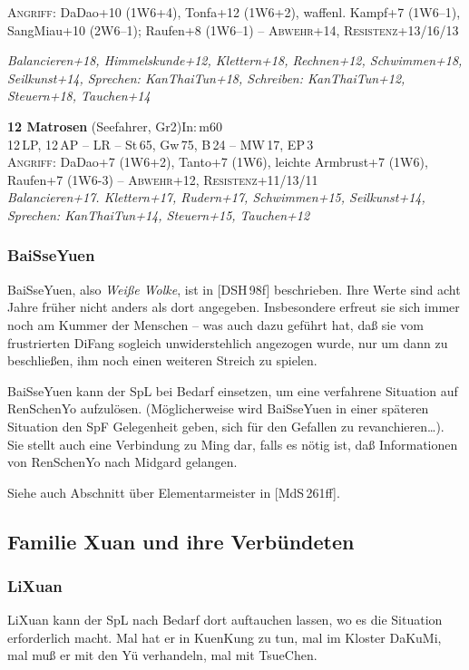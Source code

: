 \documentclass[
a4paper,
twoside,
DIV=calc,
BCOR=4mm,
fontsize=9pt,
twocolumn=on,
titlepage=on,
parskip=half
]{scrartcl}
\begin{document}
\textsc{Angriff:} DaDao+10 (1W6+4), Tonfa+12 (1W6+2),
waffenl. Kampf+7 (1W6--1), SangMiau+10 (2W6--1); Raufen+8 (1W6--1) -- 
\textsc{Abwehr}+14, \textsc{Resistenz}+13/16/13

\emph{Balancieren+18, Himmelskunde+12, Klettern+18, Rechnen+12,
  Schwimmen+18, Seilkunst+14, Sprechen: KanThaiTun+18, Schreiben:
  KanThaiTun+12, Steuern+18, Tauchen+14}

\textbf{12 Matrosen} (Seefahrer, Gr2)\hfill In:\,m60\\
12\,LP, 12\,AP -- LR -- St\,65, Gw\,75, B\,24 -- MW\,17, EP\,3\\
\textsc{Angriff:} DaDao+7 (1W6+2), Tanto+7 (1W6), leichte Armbrust+7
(1W6), Raufen+7 (1W6-3) -- \textsc{Abwehr}+12,
\textsc{Resistenz}+11/13/11\\
\emph{Balancieren+17. Klettern+17, Rudern+17, Schwimmen+15,
Seilkunst+14, Sprechen: KanThaiTun+14, Steuern+15, Tauchen+12}

\subsubsection{BaiSseYuen}

BaiSseYuen, also \emph{Weiße Wolke}, ist in [DSH\,98f]
beschrieben. Ihre Werte sind acht Jahre früher nicht anders als dort
angegeben. Insbesondere erfreut sie sich immer noch am Kummer der
Menschen -- was auch dazu geführt hat, daß sie vom frustrierten DiFang
sogleich unwiderstehlich angezogen wurde, nur um dann zu beschließen,
ihm noch einen weiteren Streich zu spielen.

BaiSseYuen kann der SpL bei Bedarf einsetzen, um eine verfahrene
Situation auf RenSchenYo aufzulösen. (Möglicherweise wird BaiSseYuen
in einer späteren Situation den SpF Gelegenheit geben, sich für den
Gefallen zu revanchieren\dots). Sie stellt auch eine Verbindung zu
Ming dar, falls es nötig ist, daß Informationen von RenSchenYo nach
Midgard gelangen.

Siehe auch Abschnitt über Elementarmeister in [MdS\,261ff].

\subsection{Familie Xuan und ihre Verbündeten}

\subsubsection{LiXuan}

LiXuan kann der SpL nach Bedarf dort auftauchen lassen, wo es die
Situation erforderlich macht. Mal hat er in KuenKung zu tun, mal im
Kloster DaKuMi, mal muß er mit den Yü verhandeln, mal mit TsueChen.
\end{document}
